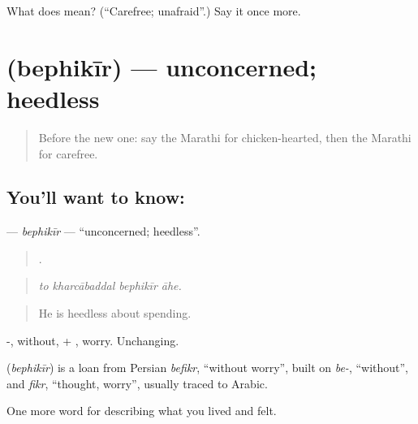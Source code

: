 \begin{tcolorbox}[breakable,colback=teal!4,colframe=teal!35!black,title={Before you move on}]
What does  mean? (\textquotedblleft{}Carefree; unafraid\textquotedblright{}.) Say it once more.
\end{tcolorbox}
\section[\texorpdfstring{\mr{बेफिकीर} (bephikīr)}{बेफिकीर (bephikīr)}]{ (bephikīr) — unconcerned; heedless}

\label{lesson:MR-C475-bephikir}



\begin{quote}
Before the new one: say the Marathi for chicken-hearted, then the Marathi for carefree.
\end{quote}

\subsection*{You'll want to know: }
\textbf{} — \emph{bephikīr} — \textquotedblleft{}unconcerned; heedless\textquotedblright{}.

\begin{quote}
   .
\end{quote}

\begin{quote}
\emph{to kharcābaddal bephikīr āhe.}
\end{quote}

\begin{quote}
He is heedless about spending.
\end{quote}

-, without, + , worry. Unchanging.

\begin{cousinweb}
\textbf{} (\emph{bephikīr}) is a loan from Persian \emph{befikr}, \textquotedblleft{}without worry\textquotedblright{}, built on \emph{be-}, \textquotedblleft{}without\textquotedblright{}, and \emph{fikr}, \textquotedblleft{}thought, worry\textquotedblright{}, usually traced to Arabic.
\end{cousinweb}

\begin{grammarlens}[title={What you've built}]
One more word for describing what you lived and felt.
\end{grammarlens}

